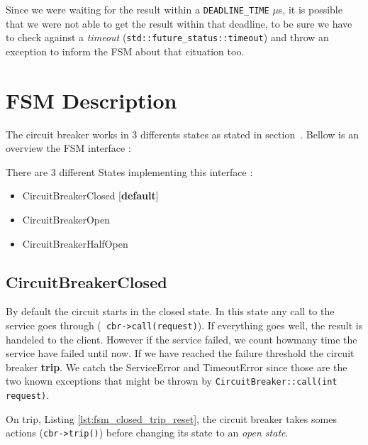 \documentclass[a4paper,12pt]{article}
\begin{document}

Since we were waiting for the result within a \verb+DEADLINE_TIME+ $\mu$s, it is possible that we were not able to get 
the result within that deadline, to be sure we have to check against a \textit{timeout} (\verb+std::future_status::timeout+) and throw an exception to inform the FSM about that cituation too.



\section{FSM Description}
The circuit breaker works in 3 differents states as stated in section~.
Bellow is an overview the FSM interface : 


There are 3 different States implementing this interface : 
\begin{itemize}
  \item CircuitBreakerClosed [\textbf{default}]
  \item CircuitBreakerOpen
  \item CircuitBreakerHalfOpen
\end{itemize}

\subsection{CircuitBreakerClosed} \label{subsec:fsm_closed}

 By default the circuit starts in the closed state. In this state any call to the service goes through (\verb+ cbr->call(request)+). If everything goes well, the result is handeled to the client. However if the service failed, we count howmany time the service have failed until now. If we have reached the failure threshold the circuit breaker \textbf{trip}. We catch the ServiceError and TimeoutError since those are the two known exceptions that might be thrown by \verb+CircuitBreaker::call(int request)+.
 
 
 
 On trip, Listing \ref{lst:fsm_closed_trip_reset}, the circuit breaker takes somes actions (\verb+cbr->trip()+) before changing its state to an \textit{open state}.
 
\end{document}
